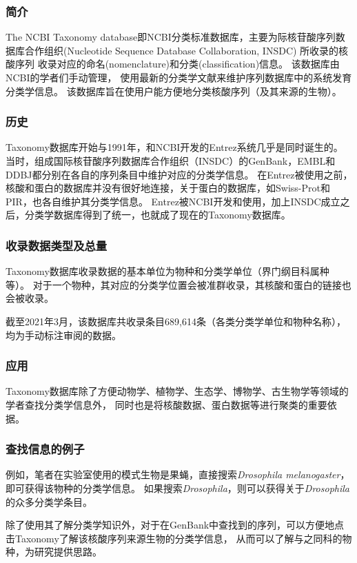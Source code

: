 \documentclass[cn,black,12pt,normal]{elegantnote}
\newcommand{\upcite}[1]{\textsuperscript{\textsuperscript{\cite{#1}}}}
\begin{document}
\subsubsection{简介}
The NCBI Taxonomy database即NCBI分类标准数据库，主要为际核苷酸序列数据库合作组织(Nucleotide Sequence Database Collaboration, INSDC)
所收录的核酸序列
收录对应的命名(nomenclature)和分类(classification)信息。
该数据库由NCBI的学者们手动管理，
使用最新的分类学文献来维护序列数据库中的系统发育分类学信息。
该数据库旨在使用户能方便地分类核酸序列（及其来源的生物）。
\subsubsection{历史}
Taxonomy数据库开始与1991年，和NCBI开发的Entrez\upcite{schuler199610}系统几乎是同时诞生的。
当时，组成国际核苷酸序列数据库合作组织（INSDC）的GenBank，EMBL和DDBJ都分别在各自的序列条目中维护对应的分类学信息。
在Entrez被使用之前，核酸和蛋白的数据库并没有很好地连接，关于蛋白的数据库，如Swiss-Prot和PIR，也各自维护其分类学信息。
Entrez被NCBI开发和使用，加上INSDC成立之后，分类学数据库得到了统一，也就成了现在的Taxonomy数据库。
\subsubsection{收录数据类型及总量}
Taxonomy数据库收录数据的基本单位为物种和分类学单位（界门纲目科属种等）。
对于一个物种，其对应的分类学位置会被准群收录，其核酸和蛋白的链接也会被收录。

截至2021年3月，该数据库共收录条目689,614条（各类分类学单位和物种名称），均为手动标注审阅的数据。
\subsubsection{应用}
Taxonomy数据库除了方便动物学、植物学、生态学、博物学、古生物学等领域的学者查找分类学信息外，
同时也是将核酸数据、蛋白数据等进行聚类的重要依据。
\subsubsection{查找信息的例子}
例如，笔者在实验室使用的模式生物是果蝇，直接搜索\textit{Drosophila melanogaster}，即可获得该物种的分类学信息。
如果搜索\textit{Drosophila}，则可以获得关于\textit{Drosophila}的众多分类学条目。

除了使用其了解分类学知识外，对于在GenBank中查找到的序列，可以方便地点击Taxonomy了解该核酸序列来源生物的分类学信息，
从而可以了解与之同科的物种，为研究提供思路。

{}
\end{document}
